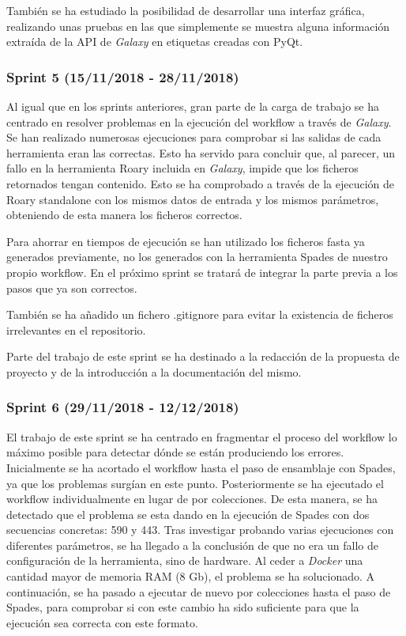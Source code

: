 También se ha estudiado la posibilidad de desarrollar una interfaz gráfica, realizando unas pruebas en las que simplemente se muestra alguna información extraída de la API de \textit{Galaxy} en etiquetas creadas con PyQt.

\subsubsection{Sprint 5 (15/11/2018 - 28/11/2018)}
Al igual que en los sprints anteriores, gran parte de la carga de trabajo se ha centrado en resolver problemas en la ejecución del workflow a través de \textit{Galaxy}. Se han realizado numerosas ejecuciones para comprobar si las salidas de cada herramienta eran las correctas. Esto ha servido para concluir que, al parecer, un fallo en la herramienta Roary incluida en \textit{Galaxy}, impide que los ficheros retornados tengan contenido. Esto se ha comprobado a través de la ejecución de Roary standalone con los mismos datos de entrada y los mismos parámetros, obteniendo de esta manera los ficheros correctos.

Para ahorrar en tiempos de ejecución se han utilizado los ficheros fasta ya generados previamente, no los generados con la herramienta Spades de nuestro propio workflow. En el próximo sprint se tratará de integrar la parte previa a los pasos que ya son correctos.

También se ha añadido un fichero .gitignore para evitar la existencia de ficheros irrelevantes en el repositorio.

Parte del trabajo de este sprint se ha destinado a la redacción de la propuesta de proyecto y de la introducción a la documentación del mismo.

\subsubsection{Sprint 6 (29/11/2018 - 12/12/2018)}
El trabajo de este sprint se ha centrado en fragmentar el proceso del workflow lo máximo posible para detectar dónde se están produciendo los errores.
Inicialmente se ha acortado el workflow hasta el paso de ensamblaje con Spades, ya que los problemas surgían en este punto. Posteriormente se ha ejecutado el workflow individualmente en lugar de por colecciones. De esta manera, se ha detectado que el problema se esta dando en la ejecución de Spades con dos secuencias concretas: 590 y 443. Tras investigar probando varias ejecuciones con diferentes parámetros, se ha llegado a la conclusión de que no era un fallo de configuración de la herramienta, sino de hardware. Al ceder a \textit{Docker} una cantidad mayor de memoria RAM (8 Gb), el problema se ha solucionado. 
A continuación, se ha pasado a ejecutar de nuevo por colecciones hasta el paso de Spades, para comprobar si con este cambio ha sido suficiente para que la ejecución sea correcta con este formato. 


